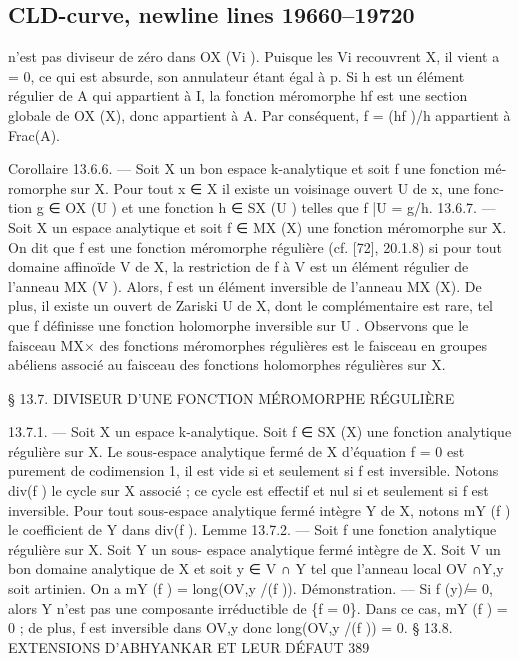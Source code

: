 \documentclass[
  10pt,
]{article}
\newenvironment{Shaded}{}{}
\newcommand{\NormalTok}[1]{#1}
\begin{document}
\subsection{CLD-curve, newline lines
19660--19720}\label{cld-curve-newline-lines-1966019720}

\begin{Shaded}
\begin{Highlighting}[]
\NormalTok{n’est pas diviseur de zéro dans OX (Vi ). Puisque les Vi recouvrent X, il vient a = 0, ce}
\NormalTok{qui est absurde, son annulateur étant égal à p.}
\NormalTok{   Si h est un élément régulier de A qui appartient à I, la fonction méromorphe hf}
\NormalTok{est une section globale de OX (X), donc appartient à A. Par conséquent, f = (hf )/h}
\NormalTok{appartient à Frac(A).}

\NormalTok{Corollaire 13.6.6. — Soit X un bon espace k{-}analytique et soit f une fonction mé{-}}
\NormalTok{romorphe sur X. Pour tout x ∈ X il existe un voisinage ouvert U de x, une fonc{-}}
\NormalTok{tion g ∈ OX (U ) et une fonction h ∈ SX (U ) telles que f |U = g/h.}
\NormalTok{13.6.7. — Soit X un espace analytique et soit f ∈ MX (X) une fonction méromorphe}
\NormalTok{sur X. On dit que f est une fonction méromorphe régulière (cf. [72], 20.1.8) si pour}
\NormalTok{tout domaine affinoïde V de X, la restriction de f à V est un élément régulier de}
\NormalTok{l’anneau MX (V ). Alors, f est un élément inversible de l’anneau MX (X). De plus, il}
\NormalTok{existe un ouvert de Zariski U de X, dont le complémentaire est rare, tel que f définisse}
\NormalTok{une fonction holomorphe inversible sur U .}
\NormalTok{   Observons que le faisceau MX× des fonctions méromorphes régulières est le faisceau}
\NormalTok{en groupes abéliens associé au faisceau des fonctions holomorphes régulières sur X.}



\NormalTok{ § 13.7. DIVISEUR D’UNE FONCTION MÉROMORPHE RÉGULIÈRE}

\NormalTok{13.7.1. — Soit X un espace k{-}analytique. Soit f ∈ SX (X) une fonction analytique}
\NormalTok{régulière sur X. Le sous{-}espace analytique fermé de X d’équation f = 0 est purement}
\NormalTok{de codimension 1, il est vide si et seulement si f est inversible. Notons div(f ) le cycle}
\NormalTok{sur X associé ; ce cycle est effectif et nul si et seulement si f est inversible.}
\NormalTok{  Pour tout sous{-}espace analytique fermé intègre Y de X, notons mY (f ) le coefficient}
\NormalTok{de Y dans div(f ).}
\NormalTok{Lemme 13.7.2. — Soit f une fonction analytique régulière sur X. Soit Y un sous{-}}
\NormalTok{espace analytique fermé intègre de X. Soit V un bon domaine analytique de X et soit}
\NormalTok{y ∈ V ∩ Y tel que l’anneau local OV ∩Y,y soit artinien. On a mY (f ) = long(OV,y /(f )).}
\NormalTok{Démonstration. — Si f (y) ̸= 0, alors Y n’est pas une composante irréductible de \{f =}
\NormalTok{0\}. Dans ce cas, mY (f ) = 0 ; de plus, f est inversible dans OV,y donc long(OV,y /(f )) = 0.}
\NormalTok{                   § 13.8. EXTENSIONS D’ABHYANKAR ET LEUR DÉFAUT                      389}


\end{Highlighting}
\end{Shaded}
\end{document}
